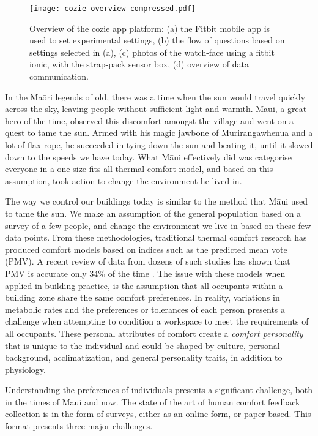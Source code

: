 
\begin{figure}
\begin{center}
\texttt{[image: cozie-overview-compressed.pdf]}
\caption{Overview of the cozie app platform: (a) the Fitbit mobile app is used to set experimental settings, (b) the flow of questions based on settings selected in (a), (c) photos of the watch-face using a fitbit ionic, with the strap-pack sensor box, (d) overview of data communication.}
\label{fig:homescreen}
\end{center}
\end{figure}

In the Ma\={o}ri legends of old, there was a time when the sun would travel quickly across the sky, leaving people without sufficient light and warmth. M\={a}ui, a great hero of the time, observed this discomfort amongst the village and went on a quest to tame the sun. Armed with his magic jawbone of Murirangawhenua and a lot of flax rope, he succeeded in tying down the sun and beating it, until it slowed down to the speeds we have today. What M\={a}ui effectively did was categorise everyone in a one-size-fits-all thermal comfort model, and based on this assumption, took action to change the environment he lived in. 

The way we control our buildings today is similar to the method that M\={a}ui used to tame the sun. We make an assumption of the general population based on a survey of a few people, and change the environment we live in based on these few data points. From these methodologies, traditional thermal comfort research has produced comfort models based on indices such as the predicted mean vote (PMV). A recent review of data from dozens of such studies has shown that PMV is accurate only 34\% of the time \cite{CHEUNG2019205}. The issue with these models when applied in building practice, is the assumption that all occupants within a building zone share the same comfort preferences. In reality, variations in metabolic rates and the preferences or tolerances of each person presents a challenge when attempting to condition a workspace to meet the requirements of all occupants. These personal attributes of comfort create a \emph{comfort personality} that is unique to the individual and could be shaped by culture, personal background, acclimatization, and general personality traits, in addition to physiology. 

Understanding the preferences of individuals presents a significant challenge, both in the times of M\={a}ui and now. The state of the art of human comfort feedback collection is in the form of surveys, either as an online form, or paper-based. This format presents three major challenges.

